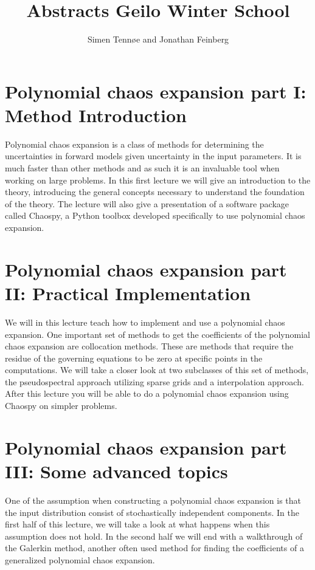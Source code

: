 \documentclass[a4paper,10pt]{article}
\title{Abstracts Geilo Winter School}
\author{Simen Tennøe and Jonathan Feinberg}
\begin{document}
\maketitle
\newpage


\section{Polynomial chaos expansion part I: Method Introduction}
Polynomial chaos expansion is a class of methods for determining the
uncertainties in forward models given uncertainty in the input parameters.
It is much faster than other methods and as such it is an invaluable tool when working on large problems.
In this first lecture we will give an introduction to the theory, introducing the 
general concepts necessary to understand the foundation of the theory.
The lecture will also give a presentation of a software
package called Chaospy, a Python toolbox developed specifically to
use polynomial chaos expansion.



\section{Polynomial chaos expansion part II: Practical Implementation}
We will in this lecture teach how to implement and use a polynomial chaos expansion.
One important set of methods to get the coefficients of the
polynomial chaos expansion are collocation methods.
These are methods that require the residue of the governing
equations to be zero at specific points in the computations.
We will take a closer look at two subclasses of this set of
methods, the pseudospectral approach utilizing sparse grids and a
interpolation approach.  After this lecture you will be able to do
a polynomial chaos expansion using Chaospy on simpler problems.




\section{Polynomial chaos expansion part III: Some advanced topics}
One of the assumption when constructing a polynomial chaos
expansion is that the input distribution consist of stochastically
independent components.
In the first half of this lecture, we will take a look at what
happens when this assumption does not hold.
In the second half we will end with a walkthrough of the Galerkin
method, another often used method for finding the coefficients of a
generalized polynomial chaos expansion.
\end{document}
